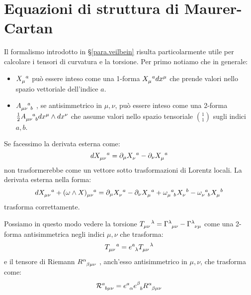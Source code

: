 \section{Equazioni di struttura di Maurer-Cartan}
Il formalismo  introdotto in \S\ref{para.veilbein} risulta particolarmente utile per calcolare i tensori di curvatura e la torsione.
Per primo notiamo che in generale:
\begin{itemize}
    \item $\tensor{X}{_\mu^a}$ può essere inteso come una 1-forma $\tensor{X}{_\mu^a}dx^\mu$ che prende valori nello spazio vettoriale dell'indice $a$.
    \item $\tensor{A}{_{\mu\nu}^a_b}$ , se antisimmetrico in $\mu,\nu$, può essere inteso come una 2-forma $\frac{1}{2}\tensor{A}{_{\mu\nu}^a_b}dx^\mu \wedge dx^\nu$ che assume valori nello spazio tensoriale $\binom{1}{1}$ sugli indici $a, b$.
\end{itemize}
Se facessimo la derivata esterna come:
\begin{equation*}
    \tensor{dX}{_{\mu\nu}^a} = \partial_\mu \tensor{X}{_\nu^a} - \partial_\nu\tensor{X}{_\mu^a}
\end{equation*}
non trasformerebbe come un vettore sotto trasformazioni di Lorentz locali. La derivata esterna nella forma:
\begin{equation}
    \tensor{dX}{_{\mu\nu}^a} + \tensor{(\omega \wedge X)}{_{\mu\nu}^a} = \partial_\mu \tensor{X}{_\nu^a} - \partial_\nu\tensor{X}{_\mu^a} + \tensor{\omega}{_\mu^a_b}\tensor{X}{_\nu^b} - \tensor{\omega}{_\nu^a_b}\tensor{X}{_\mu^b}
    \label{eq.deriv_esterna_indici_latini_greci}
\end{equation}
trasforma correttamente.

Possiamo in questo modo vedere la torsione $\tensor{T}{_{\mu\nu}^\lambda} = \tensor{\Gamma}{^\lambda_{\mu\nu}} - \tensor{\Gamma}{^\lambda_{\nu\mu}}$ come una 2-forma antisimmetrica negli indici $\mu,\nu$ che trasforma:
\begin{equation*}
    \tensor{T}{_{\mu\nu}^a} = \tensor{e}{^a_\lambda} \tensor{T}{_{\mu\nu}^\lambda}
\end{equation*}
e il tensore di Riemann $\tensor{R}{^\alpha_{\beta\mu\nu}}$ , anch'esso antisimmetrico in $\mu,\nu$, che trasforma come:
\begin{equation*}
    \tensor{\mathcal{R}}{^a_{b\mu\nu}} = \tensor{e}{^a_\alpha}\tensor{e}{^\beta_b}\tensor{R}{^\alpha_{\beta\mu\nu}}
\end{equation*}

